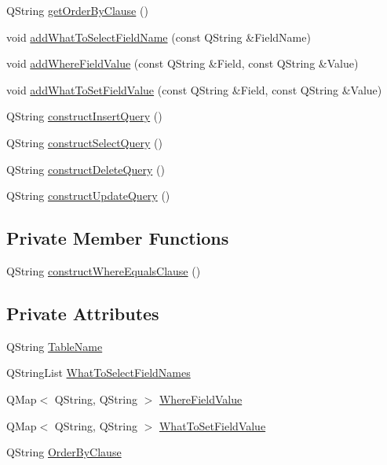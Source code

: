 \begin{DoxyCompactItemize}
\item 
Q\+String \hyperlink{classQueryConstructor_a1041679e9ba316cd61ddca2d0d73360d}{get\+Order\+By\+Clause} ()
\item 
void \hyperlink{classQueryConstructor_ab184e96ccdb30c0d6bedd904b6614e12}{add\+What\+To\+Select\+Field\+Name} (const Q\+String \&Field\+Name)
\item 
void \hyperlink{classQueryConstructor_ad72f9e11656f92958cd6751eaaa70e0e}{add\+Where\+Field\+Value} (const Q\+String \&Field, const Q\+String \&Value)
\item 
void \hyperlink{classQueryConstructor_a651b75170a7a1c7ddeae3758889133b0}{add\+What\+To\+Set\+Field\+Value} (const Q\+String \&Field, const Q\+String \&Value)
\item 
Q\+String \hyperlink{classQueryConstructor_a707ac10b6fd4dfa235e2310b0259ea8e}{construct\+Insert\+Query} ()
\item 
Q\+String \hyperlink{classQueryConstructor_ae832ca3bc59df18cb8ef08fc1d9fd75f}{construct\+Select\+Query} ()
\item 
Q\+String \hyperlink{classQueryConstructor_a1585447293c477d7c5bebf4049cbbc07}{construct\+Delete\+Query} ()
\item 
Q\+String \hyperlink{classQueryConstructor_ab17ea91cdd25440b863775526018da22}{construct\+Update\+Query} ()
\end{DoxyCompactItemize}
\subsection*{Private Member Functions}
\begin{DoxyCompactItemize}
\item 
Q\+String \hyperlink{classQueryConstructor_a7c864e227c2e76cc40a887314d43a0fe}{construct\+Where\+Equals\+Clause} ()
\end{DoxyCompactItemize}
\subsection*{Private Attributes}
\begin{DoxyCompactItemize}
\item 
Q\+String \hyperlink{classQueryConstructor_a228bdb4e6c32a592d96fe0a2562d7220}{Table\+Name}
\item 
Q\+String\+List \hyperlink{classQueryConstructor_a70251e50580cef59cbbee0c4626cf32f}{What\+To\+Select\+Field\+Names}
\item 
Q\+Map$<$ Q\+String, Q\+String $>$ \hyperlink{classQueryConstructor_ad20cc356b8452f51ddb326e989b3db9d}{Where\+Field\+Value}
\item 
Q\+Map$<$ Q\+String, Q\+String $>$ \hyperlink{classQueryConstructor_a13e503b74e3422d2b816e5e41e646f04}{What\+To\+Set\+Field\+Value}
\item 
Q\+String \hyperlink{classQueryConstructor_ad17e64b29d7e1f8fb61756eff17dd099}{Order\+By\+Clause}
\end{DoxyCompactItemize}


